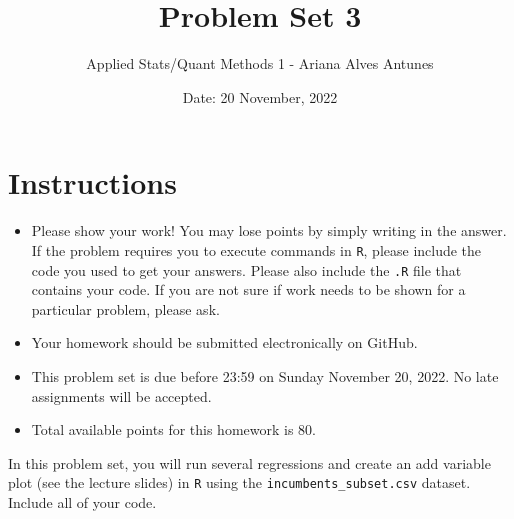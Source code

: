 \documentclass[12pt,letterpaper]{article}
\title{Problem Set 3}
\date{Date: 20 November, 2022}
\author{Applied Stats/Quant Methods 1 - 
Ariana Alves Antunes}
\begin{document}
	\maketitle
	\section*{Instructions}
	\begin{itemize}
		\item Please show your work! You may lose points by simply writing in the answer. If the problem requires you to execute commands in \texttt{R}, please include the code you used to get your answers. Please also include the \texttt{.R} file that contains your code. If you are not sure if work needs to be shown for a particular problem, please ask.
	\item Your homework should be submitted electronically on GitHub.
	\item This problem set is due before 23:59 on Sunday November 20, 2022. No late assignments will be accepted.
	\item Total available points for this homework is 80.
	\end{itemize}

		\vspace{.25cm}
	
\noindent In this problem set, you will run several regressions and create an add variable plot (see the lecture slides) in \texttt{R} using the \texttt{incumbents\_subset.csv} dataset. Include all of your code.

	\vspace{.5cm}
\end{document}
